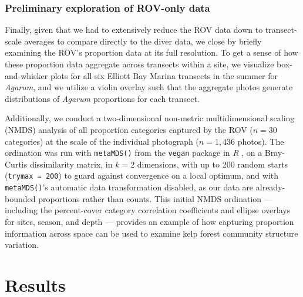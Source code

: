 \documentclass[11pt]{article}
\begin{document}
\subsubsection{Preliminary exploration of ROV-only data}
\label{subsubsec:ROV_only}

Finally, given that we had to extensively reduce the ROV data down to 
transect-scale averages to compare directly to the diver data, we close by 
briefly examining the ROV's proportion data at its full resolution. 
To get a sense of how these proportion data aggregate across transects within a 
site, we visualize box-and-whisker plots for all six Elliott Bay Marina 
transects in the summer for \textit{Agarum}, and we utilize a violin overlay 
such that the aggregate photos generate distributions of \textit{Agarum} 
proportions for each transect. 

Additionally, we conduct a two-dimensional non-metric multidimensional scaling
(NMDS) analysis of all proportion categories captured by the ROV ($n=30$
categories) at the scale of the individual photograph ($n=1{,}436$ photos).
The ordination was run with \texttt{metaMDS()} from the \texttt{vegan} package
\citep{Oksanen:2025aa} in \textit{R} \citep{RCoreTeam:2025aa}, on a
Bray-Curtis dissimilarity matrix, in $k=2$ dimensions, with up to 200 random
starts (\texttt{trymax = 200}) to guard against convergence on a local
optimum, and with \texttt{metaMDS()}'s automatic data transformation disabled,
as our data are already-bounded proportions rather than counts.
This initial NMDS ordination --- including the percent-cover category
correlation coefficients and ellipse overlays for sites, season, and depth ---
provides an example of how capturing proportion information across space can be
used to examine kelp forest community structure variation.

\section{Results}
\label{sec:results}

\end{document}
